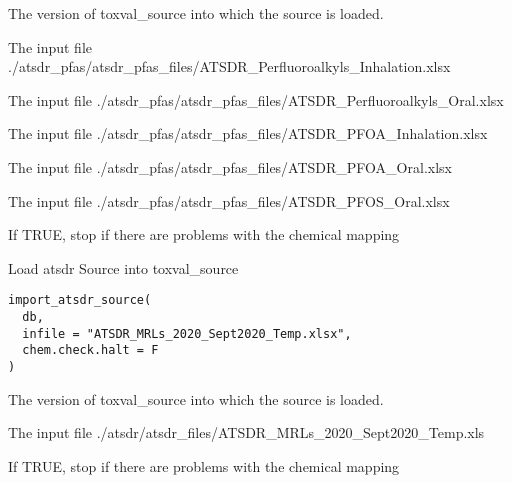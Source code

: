 \documentclass[letterpaper]{book}
\begin{document}
\begin{Arguments}
\begin{ldescription}
\item[\code{db}] The version of toxval\_source into which the source is loaded.

\item[\code{infile1}] The input file ./atsdr\_pfas/atsdr\_pfas\_files/ATSDR\_Perfluoroalkyls\_Inhalation.xlsx

\item[\code{infile2}] The input file ./atsdr\_pfas/atsdr\_pfas\_files/ATSDR\_Perfluoroalkyls\_Oral.xlsx

\item[\code{infile3}] The input file ./atsdr\_pfas/atsdr\_pfas\_files/ATSDR\_PFOA\_Inhalation.xlsx

\item[\code{infile4}] The input file ./atsdr\_pfas/atsdr\_pfas\_files/ATSDR\_PFOA\_Oral.xlsx

\item[\code{infile5}] The input file ./atsdr\_pfas/atsdr\_pfas\_files/ATSDR\_PFOS\_Oral.xlsx

\item[\code{chem.check.halt}] If TRUE, stop if there are problems with the chemical mapping
\end{ldescription}
\end{Arguments}
%
\begin{Description}\relax
Load atsdr Source into toxval\_source
\end{Description}
%
\begin{Usage}
\begin{verbatim}
import_atsdr_source(
  db,
  infile = "ATSDR_MRLs_2020_Sept2020_Temp.xlsx",
  chem.check.halt = F
)
\end{verbatim}
\end{Usage}
%
\begin{Arguments}
\begin{ldescription}
\item[\code{db}] The version of toxval\_source into which the source is loaded.

\item[\code{infile}] The input file ./atsdr/atsdr\_files/ATSDR\_MRLs\_2020\_Sept2020\_Temp.xls

\item[\code{chem.check.halt}] If TRUE, stop if there are problems with the chemical mapping
\end{ldescription}
\end{Arguments}
\end{document}
